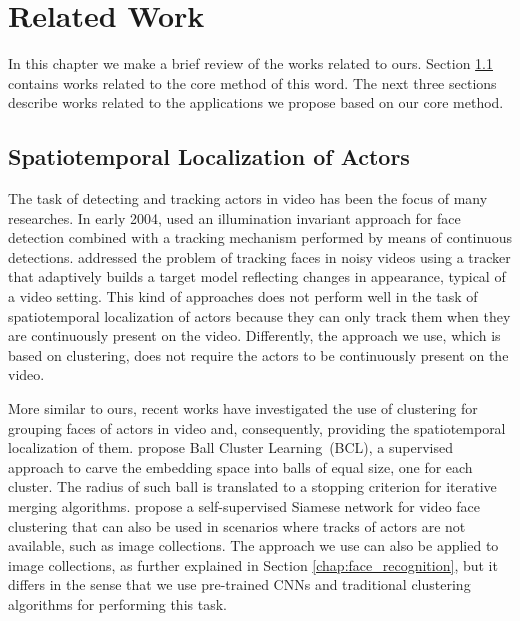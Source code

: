 \newpage

\chapter{Related Work}
\label{chap:related}

In this chapter we make a brief review of the works related to ours. Section \ref{sec:spatiotemporal} contains works related to the core method of this word. The next three sections describe works related to the applications we propose based on our core method.

\section{Spatiotemporal Localization of Actors}
\label{sec:spatiotemporal}


The task of detecting and tracking actors in video has been the focus of many researches. In early 2004, \cite{facetracking_2} used an illumination invariant approach for face detection combined with a tracking mechanism performed by means of continuous detections. \cite{face_tracking} addressed the problem of tracking faces in noisy videos using a tracker that adaptively builds a target model reflecting changes in appearance, typical of a video setting. This kind of approaches does not perform well in the task of spatiotemporal localization of actors because they can only track them when they are continuously present on the video. Differently, the approach we use, which is based on clustering, does not require the actors to be continuously present on the video.

More similar to ours, recent works have investigated the use of clustering for grouping faces of actors in video and, consequently, providing the spatiotemporal localization of them. \cite{video_face_clustering} propose Ball Cluster Learning~(BCL), a supervised approach to carve the embedding space into balls of equal size, one for each cluster. The radius of such ball is translated to a stopping criterion for iterative merging algorithms. \cite{self_supervised} propose a self-supervised Siamese network for video face clustering that can also be used in scenarios where tracks of actors are not available, such as image collections. The approach we use can also be applied to image collections, as further explained in Section \ref{chap:face_recognition}, but it differs in the sense that we use pre-trained CNNs and traditional clustering algorithms for performing this task. 

